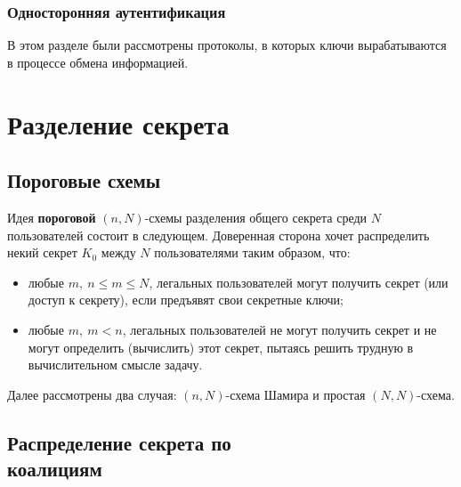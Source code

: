 \documentclass[10pt,a4paper]{book}
\begin{document}



\subsection{Односторонняя аутентификация}









В этом разделе были рассмотрены протоколы, в которых ключи вырабатываются в процессе обмена информацией.

\chapter{Разделение секрета}

\section{Пороговые схемы}

Идея \textbf{пороговой} $(n, N)$-схемы разделения общего секрета среди $N$ пользователей состоит в следующем.
Доверенная сторона хочет распределить некий секрет $K_0$ между $N$ пользователями таким образом, что:
\begin{itemize}
    \item любые $m, ~ n \le m \le N$, легальных пользователей могут получить секрет (или доступ к секрету), если предъявят свои секретные ключи;
    \item любые $m, ~ m < n$, легальных пользователей не могут получить секрет и не могут определить (вычислить) этот секрет, пытаясь решить трудную в вычислительном смысле задачу.
\end{itemize}

Далее рассмотрены два случая: $(n, N)$-схема Шамира и простая $(N,N)$-схема.





\section[Распределение секрета по коалициям]{Распределение секрета по \protect\\ коалициям}
\end{document}
